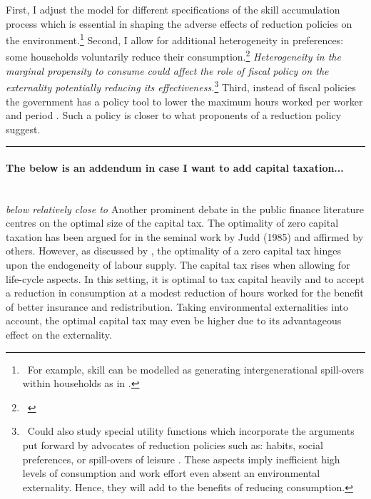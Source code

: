 First, I adjust the model for different specifications of the skill accumulation process which is essential in shaping the adverse effects of reduction policies on the environment.\footnote{\ For example, skill can be modelled as generating intergenerational spill-overs within households as in \cite{Borissov2019CarbonDevelopment}.} Second, I allow for additional heterogeneity in preferences: some households voluntarily reduce their consumption.\footnote{\ } \textit{Heterogeneity in the marginal propensity to consume could affect the role of fiscal policy on the externality potentially reducing its effectiveness.}\footnote{\ Could also study special utility functions which incorporate the arguments put forward by advocates of reduction policies such as: habits, social preferences, or  spill-overs of leisure \citep[][\textit{to be read}]{Alesina2005WorkDifferent}. These aspects imply inefficient high levels of consumption and work effort even absent an environmental externality.  Hence, they will add to the benefits of reducing consumption. 
}
Third, instead of fiscal policies the government has a policy tool to lower the maximum hours worked per worker and period \citep[\textit{compare}][]{Alvarez-Cuadrado2007EnvyHours}. Such a policy is closer to what proponents of a reduction policy suggest. %
\\

\noindent\rule[1ex]{\textwidth}{1pt}


\paragraph{The below is an addendum in case I want to add capital taxation...} \ 
\\

\noindent
\textit{below relatively close to \cite{Conesa2009TaxingAll}} 
Another prominent debate in the public finance literature centres on the optimal size of the capital tax. The optimality of zero capital taxation has been argued for in the seminal work by Judd (1985) and affirmed by others.  However, as discussed by \cite{Conesa2009TaxingAll}, the optimality of a zero capital tax hinges upon the endogeneity of labour supply. The capital tax rises when allowing for life-cycle aspects. In this setting, it is optimal to tax capital heavily and to accept a reduction in consumption at a modest reduction of hours worked for the benefit of better insurance and redistribution. Taking environmental externalities into account, the optimal capital tax may even be higher due to its advantageous effect on the externality.

